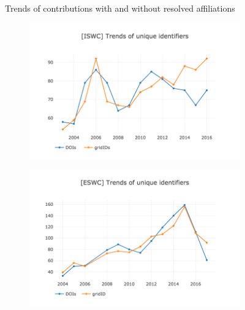 \documentclass{llncs}
\begin{document}
\begin{figure}[t]
\begin{subfigure}{.5\textwidth}
	\caption[ ]{}
	\label{fig:tpdl_contributions}
\end{subfigure}
\caption{Trends of contributions with and without resolved affiliations}
\label{fig:contributions}
\end{figure}
%
\begin{figure}[t]
\begin{subfigure}{.5\textwidth}
	\centering
	\includegraphics[width=\textwidth]{images/iswc_identifiers.png}
	\caption[ ]{}
	\label{fig:iswc_identifiers}
\end{subfigure}%
\begin{subfigure}{.5\textwidth}
	\centering
	\includegraphics[width=\textwidth]{images/eswc_identifiers.png}
	\caption[ ]{}
	\label{fig:eswc_identifiers}
\end{subfigure}
	\centering
\begin{subfigure}{.5\textwidth}
	\centering

\end{subfigure}
\end{figure}
\end{document}
